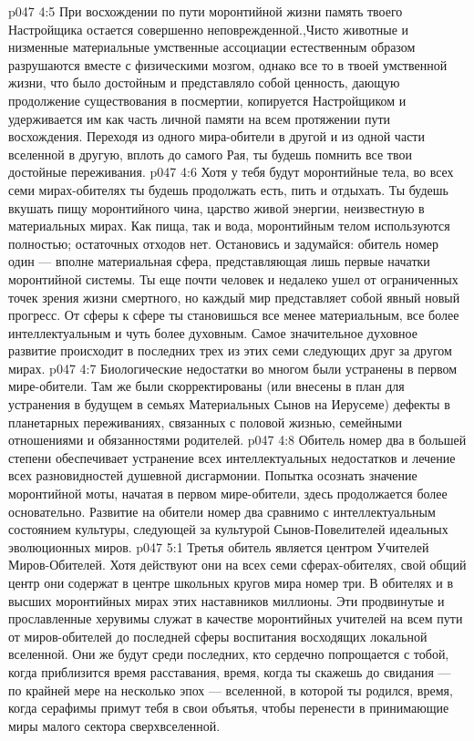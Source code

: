 \vs p047 4:5 При восхождении по пути моронтийной жизни память твоего Настройщика остается совершенно неповрежденной.,Чисто животные и низменные материальные умственные ассоциации естественным образом разрушаются вместе с физическими мозгом, однако все то в твоей умственной жизни, что было достойным и представляло собой ценность, дающую продолжение существования в посмертии, копируется Настройщиком и удерживается им как часть личной памяти на всем протяжении пути восхождения. Переходя из одного мира\hyp{}обители в другой и из одной части вселенной в другую, вплоть до самого Рая, ты будешь помнить все твои достойные переживания.
\vs p047 4:6 Хотя у тебя будут моронтийные тела, во всех семи мирах\hyp{}обителях ты будешь продолжать есть, пить и отдыхать. Ты будешь вкушать пищу моронтийного чина, царство живой энергии, неизвестную в материальных мирах. Как пища, так и вода, моронтийным телом используются полностью; остаточных отходов нет. Остановись и задумайся: обитель номер один --- вполне материальная сфера, представляющая лишь первые начатки моронтийной системы. Ты еще почти человек и недалеко ушел от ограниченных точек зрения жизни смертного, но каждый мир представляет собой явный новый прогресс. От сферы к сфере ты становишься все менее материальным, все более интеллектуальным и чуть более духовным. Самое значительное духовное развитие происходит в последних трех из этих семи следующих друг за другом мирах.
\vs p047 4:7 Биологические недостатки во многом были устранены в первом мире\hyp{}обители. Там же были скорректированы (или внесены в план для устранения в будущем в семьях Материальных Сынов на Иерусеме) дефекты в планетарных переживаниях, связанных с половой жизнью, семейными отношениями и обязанностями родителей.
\vs p047 4:8 Обитель номер два в большей степени обеспечивает устранение всех интеллектуальных недостатков и лечение всех разновидностей душевной дисгармонии. Попытка осознать значение моронтийной моты, начатая в первом мире\hyp{}обители, здесь продолжается более основательно. Развитие на обители номер два сравнимо с интеллектуальным состоянием культуры, следующей за культурой Сынов\hyp{}Повелителей идеальных эволюционных миров.
\vs p047 5:1 Третья обитель является центром Учителей Миров\hyp{}Обителей. Хотя действуют они на всех семи сферах\hyp{}обителях, свой общий центр они содержат в центре школьных кругов мира номер три. В обителях и в высших моронтийных мирах этих наставников миллионы. Эти продвинутые и прославленные херувимы служат в качестве моронтийных учителей на всем пути от миров\hyp{}обителей до последней сферы воспитания восходящих локальной вселенной. Они же будут среди последних, кто сердечно попрощается с тобой, когда приблизится время расставания, время, когда ты скажешь до свидания --- по крайней мере на несколько эпох --- вселенной, в которой ты родился, время, когда серафимы примут тебя в свои объятья, чтобы перенести в принимающие миры малого сектора сверхвселенной.
